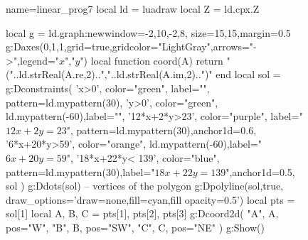 \documentclass[12pt,a4paper]{article}
\begin{document}
\begin{figure}[H]
  \centering
\begin{luadraw}{name=linear_prog7}
local ld = luadraw
local Z = ld.cpx.Z

local g = ld.graph:new{window={-2,10,-2,8}, size={15,15},margin=0.5}
g:Daxes({0,1,1},{grid=true,gridcolor="LightGray",arrows="->",legend={"$x$","$y$"}})
local function coord(A)
    return "("..ld.strReal(A.re,2)..","..ld.strReal(A.im,2)..")"
end
local sol = {}
g:Dconstraints(
'x>0', {color="green", label="", pattern=ld.mypattern(30)},
'y>0', {color="green", ld.mypattern(-60),label=""},
     '12*x+2*y>23', {color="purple", label="$12x+2y=23$", pattern=ld.mypattern(30),anchor1d=0.6},
 '6*x+20*y>59', {color="orange", ld.mypattern(-60),label="$6x+20y=59$"},
'18*x+22*y< 139', {color="blue", pattern=ld.mypattern(30),label="$18x+22y=139$",anchor1d=0.5},
    sol
    )
g:Ddots(sol) -- vertices of the polygon
g:Dpolyline(sol,true, {draw_options='draw=none,fill=cyan,fill opacity=0.5'})
local pts = sol[1] 
local A, B, C = pts[1], pts[2], pts[3]
g:Dcoord2d(
    "A", A, {pos="W"},
    "B", B, {pos="SW"},
    "C", C, {pos="NE"}
)
g:Show()
\end{luadraw}
  \caption{}
\end{figure}
\end{document}
